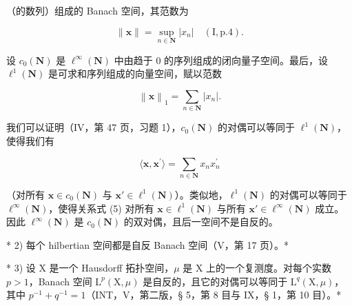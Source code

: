 （的数列）组成的 Banach 空间，其范数为

\[
\| \mathbf {x} \| = \sup _ {n \in \mathbf {N}} | x _ {n} | \quad (\mathrm{I}, \text {p.} 4).\tag{3}
\]

设 \(c_{0}(\mathbf{N})\) 是 \(\ell^{\infty}(\mathbf{N})\) 中由趋于 0 的序列组成的闭向量子空间。最后，设 \(\ell^{1}(\mathbf{N})\) 是可求和序列组成的向量空间，赋以范数

\[
\left\| \mathbf {x} \right\| _ {1} = \sum_ {n \in \mathbf {N}} \left| x _ {n} \right|.\tag{4}
\]

我们可以证明（IV，第 47 页，习题 1），\(c_0(\mathbf{N})\) 的对偶可以等同于 \(\ell^1 (\mathbf{N})\)，使得我们有

\[
\langle \mathbf {x}, \mathbf {x} ^ {\prime} \rangle = \sum_ {n \in \mathbf {N}} x _ {n} x _ {n} ^ {\prime}\tag{5}
\]

（对所有 \(\mathbf{x} \in c_0(\mathbf{N})\) 与 \(\mathbf{x}' \in \ell^1(\mathbf{N})\)）。类似地，\(\ell^1(\mathbf{N})\) 的对偶可以等同于 \(\ell^\infty(\mathbf{N})\)，使得关系式 (5) 对所有 \(\mathbf{x} \in \ell^1(\mathbf{N})\) 与所有 \(\mathbf{x}' \in \ell^\infty(\mathbf{N})\) 成立。因此 \(\ell^\infty(\mathbf{N})\) 是 \(c_0(\mathbf{N})\) 的双对偶，且后一空间不是自反的。

* 2) 每个 hilbertian 空间都是自反 Banach 空间（V，第 17 页）。*

* 3) 设 X 是一个 Hausdorff 拓扑空间，\(\mu\) 是 X 上的一个复测度。对每个实数 \(p > 1\)，Banach 空间 \(\mathrm{L}^p (\mathrm{X},\mu)\) 是自反的，且它的对偶可以等同于 \(\mathrm{L}^q (\mathrm{X},\mu)\)，其中 \(p^{-1} + q^{-1} = 1\)（INT，V，第二版，§ 5，第 8 目与 IX，§ 1，第 10 目）。*

